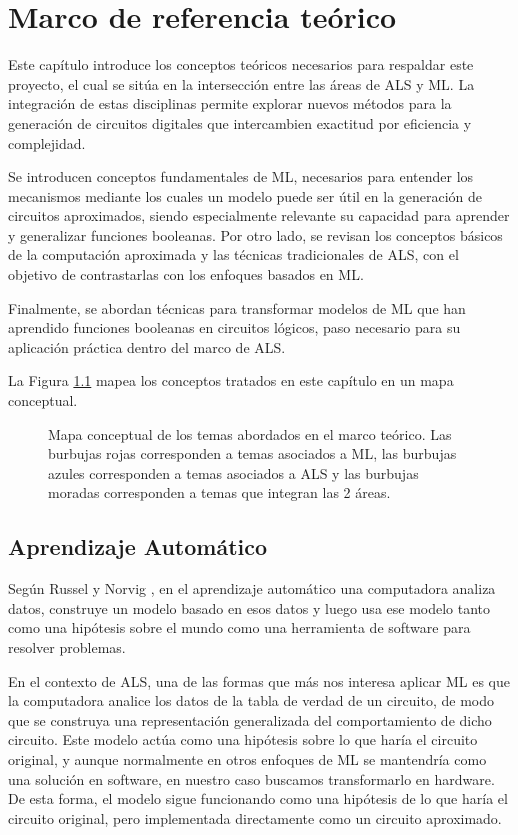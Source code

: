 \chapter{Marco de referencia teórico}

Este capítulo introduce los conceptos teóricos necesarios para respaldar este
proyecto, el cual se sitúa en la intersección entre las áreas de ALS y ML. La
integración de estas disciplinas permite explorar nuevos métodos para la
generación de circuitos digitales que intercambien exactitud por eficiencia y
complejidad.

Se introducen conceptos fundamentales de ML, necesarios para entender los
mecanismos mediante los cuales un modelo puede ser útil en la generación de
circuitos aproximados, siendo especialmente relevante su capacidad para
aprender y generalizar funciones booleanas. Por otro lado, se revisan los
conceptos básicos de la computación aproximada y las técnicas tradicionales de
ALS, con el objetivo de contrastarlas con los enfoques basados en ML.

Finalmente, se abordan técnicas para transformar modelos de ML que han
aprendido funciones booleanas en circuitos lógicos, paso necesario para su
aplicación práctica dentro del marco de ALS.

La Figura \ref{fig:mapa_conceptual} mapea los conceptos tratados en
este capítulo en un mapa conceptual.

\begin{figure}[ht]
  \centering
  
  \caption{Mapa conceptual de los temas abordados en el marco teórico. Las burbujas rojas corresponden a temas asociados a ML, las burbujas azules corresponden a temas asociados a ALS y las burbujas moradas corresponden a temas que integran las 2 áreas.}
  \label{fig:mapa_conceptual}
\end{figure}

\section{Aprendizaje Automático}

Según Russel y Norvig \cite{russell2016artificial}, en el aprendizaje automático una computadora analiza datos, construye un modelo
basado en esos datos y luego usa ese modelo tanto como una hipótesis sobre el
mundo como una herramienta de software para resolver problemas.

En el contexto de ALS, una de las formas que más nos interesa aplicar ML es
que la computadora analice los datos de la tabla de verdad de un circuito,
de modo que se construya una representación generalizada del comportamiento de
dicho circuito.
Este modelo actúa como una hipótesis sobre lo que haría el circuito original, y
aunque normalmente en otros enfoques de ML se mantendría como una solución en
software, en nuestro caso buscamos transformarlo en hardware. De esta forma, el
modelo sigue funcionando como una hipótesis de lo que haría el circuito
original, pero implementada directamente como un circuito aproximado.

